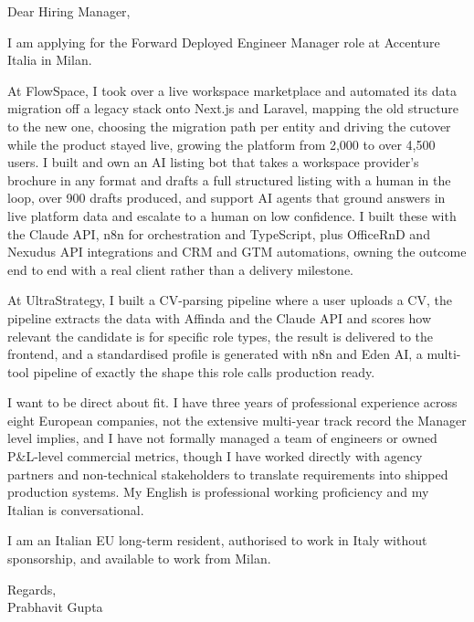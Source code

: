 \documentclass[a4paper,11pt]{article}
\begin{document}
Dear Hiring Manager,

I am applying for the Forward Deployed Engineer Manager role at Accenture Italia in Milan.

At FlowSpace, I took over a live workspace marketplace and automated its data migration off a legacy stack onto Next.js and Laravel, mapping the old structure to the new one, choosing the migration path per entity and driving the cutover while the product stayed live, growing the platform from 2,000 to over 4,500 users. I built and own an AI listing bot that takes a workspace provider's brochure in any format and drafts a full structured listing with a human in the loop, over 900 drafts produced, and support AI agents that ground answers in live platform data and escalate to a human on low confidence. I built these with the Claude API, n8n for orchestration and TypeScript, plus OfficeRnD and Nexudus API integrations and CRM and GTM automations, owning the outcome end to end with a real client rather than a delivery milestone.

At UltraStrategy, I built a CV-parsing pipeline where a user uploads a CV, the pipeline extracts the data with Affinda and the Claude API and scores how relevant the candidate is for specific role types, the result is delivered to the frontend, and a standardised profile is generated with n8n and Eden AI, a multi-tool pipeline of exactly the shape this role calls production ready.

I want to be direct about fit. I have three years of professional experience across eight European companies, not the extensive multi-year track record the Manager level implies, and I have not formally managed a team of engineers or owned P\&L-level commercial metrics, though I have worked directly with agency partners and non-technical stakeholders to translate requirements into shipped production systems. My English is professional working proficiency and my Italian is conversational.

I am an Italian EU long-term resident, authorised to work in Italy without sponsorship, and available to work from Milan.

Regards,\\
Prabhavit Gupta
\end{document}
